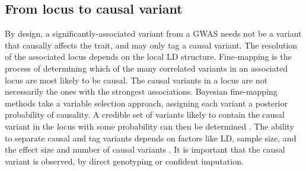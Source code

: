 \begin{outline}
%
%
%
%
%

\subsection{From locus to causal variant}

By design, a significantly-associated variant from a \gls{GWAS} needs not be a variant that causally affects the trait, and may only tag a causal variant.
The resolution of the associated locus depends on the local \gls{LD} structure.
Fine-mapping is the process of determining which of the many correlated variants in an associated locus are most likely to be causal.
The causal variants in a locus are not necessarily the ones with the strongest associations.
Bayesian fine-mapping methods take a variable selection approach, 
assigning each variant a posterior probability of causality.
A credible set of variants likely to contain the causal variant in the locus with some probability can then be determined \autocite{schaid2018GenomewideAssociationsCandidate,wang2020SimpleNewApproach}.
The ability to separate causal and tag variants depends on factors like \gls{LD}, sample size, and the effect size and number of causal variants  \autocite{visscher201710YearsGWAS,schaid2018GenomewideAssociationsCandidate}.
It is important that the causal variant is observed, by direct genotyping or confident imputation.


\end{outline}
